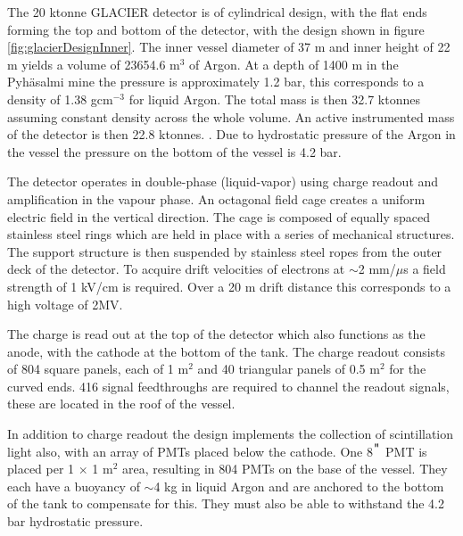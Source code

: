 The 20 ktonne GLACIER detector is of cylindrical design, with the flat ends forming the top and bottom of the detector, with the design shown in figure \ref{fig:glacierDesignInner}. The inner vessel diameter of 37 m and inner height of 22 m yields a volume of 23654.6 m$^{3}$ of Argon. At a depth of 1400 m in the Pyh\"asalmi mine the pressure is approximately 1.2 bar, this corresponds to a density of 1.38 gcm$^{-3}$ for liquid Argon. The total mass is then 32.7 ktonnes assuming constant density across the whole volume. An active instrumented mass of the detector is then 22.8 ktonnes. \cite{lbnoEoI}. Due to hydrostatic pressure of the Argon in the vessel the pressure on the bottom of the vessel is 4.2 bar.

The detector operates in double-phase (liquid-vapor) using charge readout and amplification in the vapour phase. An octagonal field cage creates a uniform electric field in the vertical direction. The cage is composed of equally spaced stainless steel rings which are held in place with a series of mechanical structures. The support structure is then suspended by stainless steel ropes from the outer deck of the detector. To acquire drift velocities of electrons at $\sim$2 mm/$\mu$s a field strength of 1 kV/cm is required. Over a 20 m drift distance this corresponds to a high voltage of 2MV. 

The charge is read out at the top of the detector which also functions as the anode, with the cathode at the bottom of the tank. The charge readout consists of 804 square panels, each of 1 m$^{2}$ and 40 triangular panels of 0.5 m$^{2}$ for the curved ends. 416 signal feedthroughs are required to channel the readout signals, these are located in the roof of the vessel.

In addition to charge readout the design implements the collection of scintillation light also, with an array of PMTs placed below the cathode. One 8$^{\verb+"+}$ PMT is placed per 1 $\times$ 1 m$^{2}$ area, resulting in 804 PMTs on the base of the vessel. They each have a buoyancy of $\sim$4 kg in liquid Argon and are anchored to the bottom of the tank to compensate for this. They must also be able to withstand the 4.2 bar hydrostatic pressure. 

